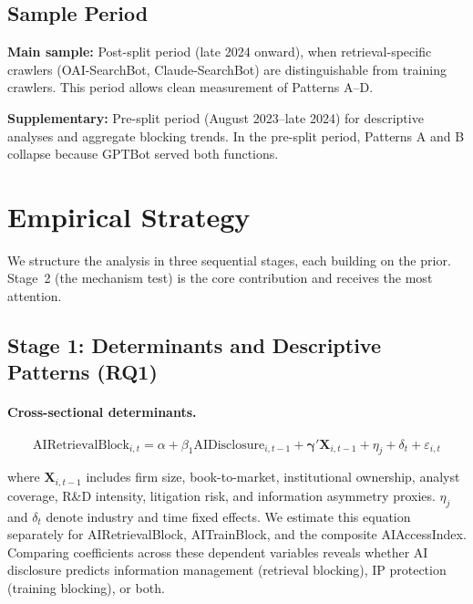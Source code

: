 \documentclass[12pt,a4paper]{article}
\begin{document}
\subsection{Sample Period}

\textbf{Main sample:} Post-split period (late 2024 onward), when retrieval-specific crawlers (OAI-SearchBot, Claude-SearchBot) are distinguishable from training crawlers. This period allows clean measurement of Patterns A--D.

\textbf{Supplementary:} Pre-split period (August 2023--late 2024) for descriptive analyses and aggregate blocking trends. In the pre-split period, Patterns A and B collapse because GPTBot served both functions.

\section{Empirical Strategy}

We structure the analysis in three sequential stages, each building on the prior. Stage~2 (the mechanism test) is the core contribution and receives the most attention.

\subsection{Stage 1: Determinants and Descriptive Patterns (RQ1)}

\paragraph{Cross-sectional determinants.}
\begin{equation}
\text{AIRetrievalBlock}_{i,t} = \alpha + \beta_1 \text{AIDisclosure}_{i,t-1} + \boldsymbol{\gamma}' \mathbf{X}_{i,t-1} + \eta_j + \delta_t + \varepsilon_{i,t}
\end{equation}

\noindent where $\mathbf{X}_{i,t-1}$ includes firm size, book-to-market, institutional ownership, analyst coverage, R\&D intensity, litigation risk, and information asymmetry proxies. $\eta_j$ and $\delta_t$ denote industry and time fixed effects. We estimate this equation separately for AIRetrievalBlock, AITrainBlock, and the composite AIAccessIndex. Comparing coefficients across these dependent variables reveals whether AI disclosure predicts information management (retrieval blocking), IP protection (training blocking), or both.
\end{document}
